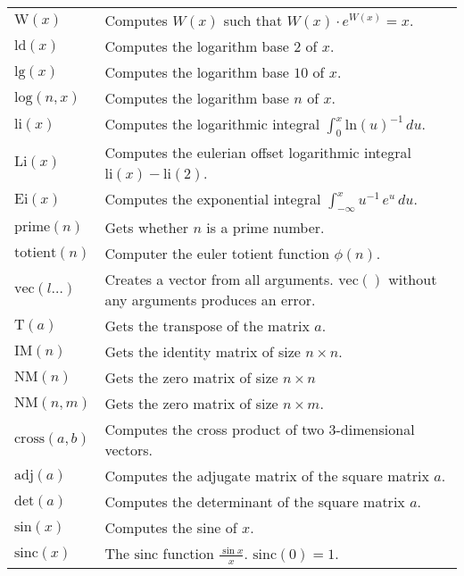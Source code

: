 \documentclass[10pt]{article}
\newcommand{\tabgap}{\vspace{3mm}\\}
\begin{document}
\begin{longtable}{p{}p{}}
        $ \mathrm{W}(x) $                          & Computes $ W(x) $ such that $ W(x) \cdot e^{W(x)} = x $. \\
        $ \mathrm{ld}(x) $                         & Computes the logarithm base $ 2 $ of $ x $. \\
        $ \mathrm{lg}(x) $                         & Computes the logarithm base $ 10 $ of $ x $. \\
        $ \mathrm{log}(n, x) $                     & Computes the logarithm base $ n $ of $ x $. \tabgap
        $ \mathrm{li}(x) $                         & Computes the logarithmic integral $ \int_0^x \mathrm{ln}(u)^{-1}\,du $. \\
        $ \mathrm{Li}(x) $                         & Computes the eulerian offset logarithmic integral $ \mathrm{li}(x) - \mathrm{li}(2) $. \\
        $ \mathrm{Ei}(x) $                         & Computes the exponential integral $ \int_{-\infty}^x u^{-1}\,e^u\,du $. \tabgap
        $ \mathrm{prime}(n) $                      & Gets whether $ n $ is a prime number. \\
        $ \mathrm{totient}(n) $                    & Computer the euler totient function $ \phi(n) $. \tabgap
        $ \mathrm{vec}(l\dots) $                   & Creates a vector from all arguments. $ \mathrm{vec}() $ without any arguments produces an error. \\
        $ \mathrm{T}(a) $                          & Gets the transpose of the matrix $ a $. \\
        $ \mathrm{IM}(n) $                         & Gets the identity matrix of size $ n\times n $. \\
        $ \mathrm{NM}(n) $                         & Gets the zero matrix of size $ n\times n $ \\
        $ \mathrm{NM}(n,m) $                       & Gets the zero matrix of size $ n\times m $. \\
        $ \mathrm{cross}(a, b) $                   & Computes the cross product of two $ 3 $-dimensional vectors. \\
        $ \mathrm{adj}(a) $                        & Computes the adjugate matrix of the square matrix $ a $. \\
        $ \mathrm{det}(a) $                        & Computes the determinant of the square matrix $ a $. \tabgap
        $ \mathrm{sin}(x) $                        & Computes the sine of $ x $. \\
        $ \mathrm{sinc}(x) $                       & The $ \mathrm{sinc} $ function $ \frac{\sin x}{x} $. $ \mathrm{sinc}(0) = 1 $. \\

\end{longtable}
\end{document}
